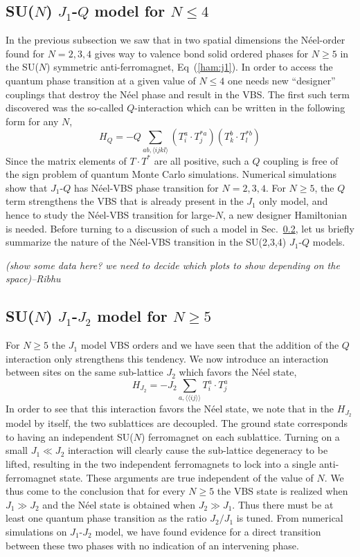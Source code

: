 \documentclass[aps,prb,groupedaddress,twocolumn]{revtex4}
\begin{document}
\subsection{SU($N$) $J_1$-$Q$ model for $N\leq 4$}
\label{ss:jqN}
In the previous subsection we saw that in two spatial dimensions the
N\'eel-order found for $N=2,3,4$ gives way to valence bond solid
ordered phases for $N\geq 5$ in the SU($N$) symmetric
anti-ferromagnet, Eq~(\ref{ham:j1}). In order to access the quantum
phase transition at a given value of $N\leq 4$ one needs new
``designer'' couplings that
destroy the N\'eel phase and result in the VBS. The first such term discovered was
the so-called $Q$-interaction which can be written in the following
form for any $N$,
\begin{equation}
H_{Q} = - Q \sum_{ab,\langle ijkl \rangle} \left ( T^a_i\cdot
  T^{*a}_j\right ) \left ( T^b_k\cdot T^{*b}_l \right )
\end{equation}
Since the matrix elements of $T\cdot T^*$ are all positive, such a $Q$
coupling is free of the sign problem of quantum Monte Carlo
simulations. Numerical simulations show that $J_1$-$Q$ has N\'eel-VBS
phase transition for $N=2,3,4$. For $N\geq 5$, the $Q$ term strengthens
the VBS that is already present in the $J_1$ only model, and hence to
study the N\'eel-VBS transition for large-$N$, a new designer
Hamiltonian is needed. Before turning to a discussion of such a model in
Sec.~\ref{ss:j1j2N}, let us briefly summarize the nature of the
N\'eel-VBS transition in the SU(2,3,4) $J_1$-$Q$ models.

{\em (show some data here? we need to decide which plots to show
  depending on the space)--Ribhu}

\subsection{SU($N$) $J_1$-$J_2$ model for $N\geq 5$}
\label{ss:j1j2N}

For $N\geq 5$ the $J_1$ model VBS orders and we have seen that the
addition of the $Q$ interaction only strengthens this tendency. We now
introduce an interaction between sites on the same sub-lattice $J_2$ which favors the N\'eel state,
\begin{equation}
H_{J_2}= -J_2 \sum_{a,\langle\langle ij\rangle\rangle} T^a_i\cdot T^{a}_j
\end{equation}
In order to see that this interaction favors the N\'eel state, we note
that in the $H_{J_2}$ model by itself, the two sublattices are
decoupled. The ground state corresponds to having an independent SU($N$) ferromagnet on
each sublattice. Turning on a small $J_1\ll J_2$ interaction will clearly cause
the sub-lattice degeneracy to be lifted, resulting in the
two independent ferromagnets to lock into a single
anti-ferromagnet state. These arguments are true independent of the
value of $N$. We thus
come to the conclusion that for every $N\geq 5$ the VBS state is
realized when $J_1\gg J_2$ and the N\'eel state is obtained when $J_2
\gg J_1$. Thus there must be at least one quantum phase transition as
the ratio
$J_2/J_1$ is tuned. From numerical simulations on $J_1$-$J_2$ model, we have found
evidence for a direct transition between these two phases with no
indication of an intervening phase. 
\end{document}
